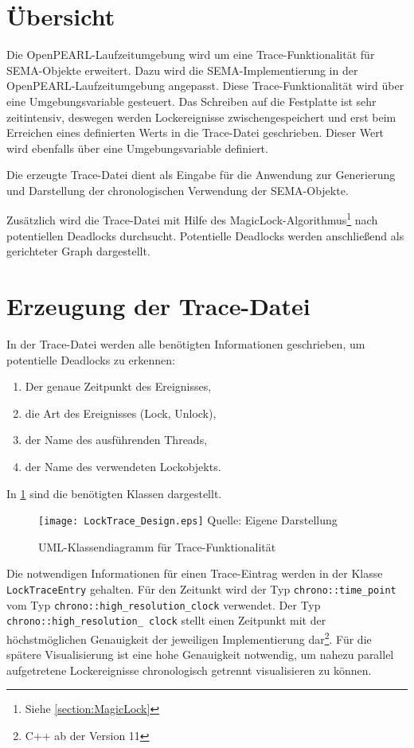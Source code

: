 \section{Übersicht}
\label{section:Übersicht}
Die OpenPEARL-Laufzeitumgebung wird um eine Trace-Funktionalität für
\textrm{SEMA-Objekte} erweitert. Dazu wird die \textrm{SEMA-Implementierung} in
der OpenPEARL-Laufzeitumgebung angepasst. Diese Trace-Funktionalität wird über
eine Umgebungsvariable gesteuert. Das Schreiben auf die Festplatte ist sehr
zeitintensiv, deswegen werden Lockereignisse zwischengespeichert und erst beim
Erreichen eines definierten Werts in die Trace-Datei geschrieben. Dieser Wert
wird ebenfalls über eine Umgebungsvariable definiert.

Die erzeugte Trace-Datei dient als Eingabe für die Anwendung zur Generierung und
Darstellung der chronologischen Verwendung der \textrm{SEMA-Objekte}.

Zusätzlich wird die Trace-Datei mit Hilfe des
MagicLock-Algorithmus\footnote{Siehe \cref{section:MagicLock}} nach potentiellen
Deadlocks durchsucht. Potentielle Deadlocks werden anschließend als gerichteter
Graph dargestellt.

\section{Erzeugung der Trace-Datei}
\label{section:Erzeugung der Trace-Datei}
In der Trace-Datei werden alle benötigten Informationen geschrieben, um
potentielle Deadlocks zu erkennen:
\begin{enumerate}
  \item Der genaue Zeitpunkt des Ereignisses,
  \item die Art des Ereignisses (Lock, Unlock),
  \item der Name des ausführenden Threads,
  \item der Name des verwendeten Lockobjekts.
\end{enumerate}

In \cref{fig:LockTrace_Design} sind die benötigten Klassen dargestellt.
\begin{figure}[ht]
  \texttt{[image: LockTrace\_Design.eps]}
  \footnotesize\sffamily Quelle: Eigene Darstellung
  \caption{UML-Klassendiagramm für Trace-Funktionalität}
  \label{fig:LockTrace_Design}
\end{figure}
Die notwendigen Informationen für einen Trace-Eintrag werden in der Klasse
\texttt{Lock\-Trace\-Entry} gehalten. Für den Zeitunkt wird der Typ 
\texttt{chrono::\-time\_point} vom Typ \texttt{chrono::\-high\_\allowbreak resolution\_\allowbreak clock}
verwendet. Der Typ \texttt{chrono::\-high\_\allowbreak resolution\_\allowbreak
clock} stellt einen Zeitpunkt mit der höchstmöglichen Genauigkeit der jeweiligen
Implementierung dar\footnote{C++ ab der Version 11}. Für die spätere
Visualisierung ist eine hohe Genauigkeit notwendig, um nahezu parallel
aufgetretene Lockereignisse chronologisch getrennt visualisieren zu können.

